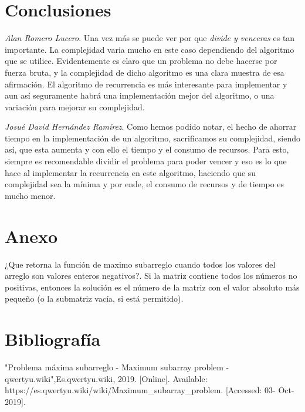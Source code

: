 \documentclass[12pt,twoside]{article}
\begin{document}
\section{Conclusiones}

\textit{Alan Romero Lucero}. Una vez m\'as se puede ver por que \textit{divide y venceras} es tan importante. La complejidad varia mucho en este caso dependiendo del algoritmo que se utilice. Evidentemente es claro que un problema no debe hacerse por fuerza bruta, y la complejidad de dicho algoritmo es una clara muestra de esa afirmaci\'on. El algoritmo de recurrencia es m\'as interesante para implementar y aun as\'i seguramente habr\'a una implementaci\'on mejor del algoritmo, o una variaci\'on para mejorar su complejidad.

\textit{Josu\'e David Hern\'andez Ram\'irez}.
Como hemos podido notar, el hecho de ahorrar tiempo en la implementaci\'on de un algoritmo, sacrificamos su complejidad, siendo as\'i, que esta aumenta y con ello el tiempo y el consumo de recursos. \newline
Para esto, siempre es recomendable dividir el problema para poder vencer y eso es lo que hace al implementar la recurrencia en este algoritmo, haciendo que su complejidad sea la m\'inima y por ende, el consumo de recursos y de tiempo es mucho menor.
\section{Anexo}
¿Qu\´e retorna la funci\'on de m\´aximo subarreglo cuando todos los valores del arreglo son valores enteros negativos?.
\newline \newline
Si la matriz contiene todos los números no positivas, entonces la solución es el número de la matriz con el valor absoluto más pequeño (o la submatriz vacía, si está permitido).
\section{Bibliograf\'ia}
"Problema máxima subarreglo - Maximum subarray problem - qwertyu.wiki",\newline Es.qwertyu.wiki, 2019. [Online]. Available: \newline https://es.qwertyu.wiki/wiki/Maximum_subarray_problem. [Accessed: 03- Oct- 2019].
\end{document}
